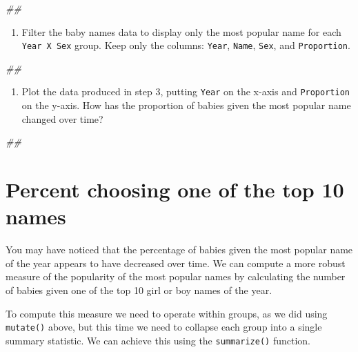 \documentclass[]{book}
\newenvironment{Shaded}{\begin{snugshade}}{\end{snugshade}}
\newcommand{\CommentTok}[1]{\textcolor[rgb]{0.56,0.35,0.01}{\textit{#1}}}
\providecommand{\tightlist}{%
  \setlength{\itemsep}{0pt}\setlength{\parskip}{0pt}}
\begin{document}
\begin{Shaded}
\begin{Highlighting}[]
\CommentTok{##}
\end{Highlighting}
\end{Shaded}

\begin{enumerate}
\def\labelenumi{\arabic{enumi}.}
\setcounter{enumi}{2}
\tightlist
\item
  Filter the baby names data to display only the most popular name
  for each \texttt{Year\ X\ Sex} group. Keep only the columns: \texttt{Year}, \texttt{Name},
  \texttt{Sex}, and \texttt{Proportion}.
\end{enumerate}

\begin{Shaded}
\begin{Highlighting}[]
\CommentTok{##}
\end{Highlighting}
\end{Shaded}

\begin{enumerate}
\def\labelenumi{\arabic{enumi}.}
\setcounter{enumi}{3}
\tightlist
\item
  Plot the data produced in step 3, putting \texttt{Year} on the x-axis
  and \texttt{Proportion} on the y-axis. How has the proportion of babies
  given the most popular name changed over time?
\end{enumerate}

\begin{Shaded}
\begin{Highlighting}[]
\CommentTok{##}
\end{Highlighting}
\end{Shaded}

\hypertarget{percent-choosing-one-of-the-top-10-names}{%
\section{Percent choosing one of the top 10 names}\label{percent-choosing-one-of-the-top-10-names}}

You may have noticed that the percentage of babies given the most
popular name of the year appears to have decreased over time. We can
compute a more robust measure of the popularity of the most popular
names by calculating the number of babies given one of the top 10 girl
or boy names of the year.

To compute this measure we need to operate within groups, as
we did using \texttt{mutate()} above, but this time we need to collapse each
group into a single summary statistic. We can achieve this using the
\texttt{summarize()} function.
\end{document}

